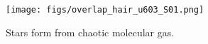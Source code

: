 
\begin{figure} \begin{center}
\texttt{[image: figs/overlap\_hair\_u603\_S01.png]}
\caption[ ]{Stars form from chaotic molecular gas. }
\label{fig.cores} \end{center} \end{figure}
